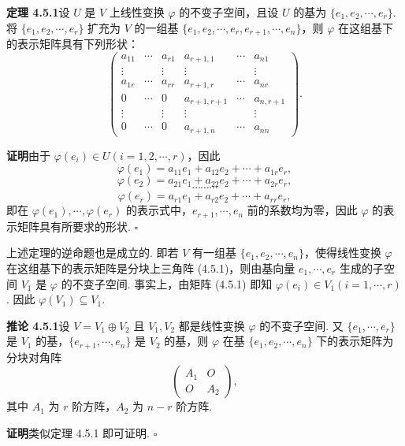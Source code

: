 \documentclass[UTF8,12pt,a4paper,fontset=fandol]{ctexart}
\begin{document}
\noindent\textbf{定理 4.5.1}\quad 设 $U$ 是 $V$ 上线性变换 $\varphi$ 的不变子空间，且设 $U$ 的基为 $\{e_1,e_2,\cdots,e_r\}$. 将 $\{e_1,e_2,\cdots,e_r\}$ 扩充为 $V$ 的一组基 $\{e_1,e_2,\cdots,e_r,e_{r+1},\cdots,e_n\}$，则 $\varphi$ 在这组基下的表示矩阵具有下列形状：
\begin{equation}
\left(\begin{array}{cccccc}
a_{11} & \cdots & a_{r1} & a_{r+1,1} & \cdots & a_{n1}\\
\vdots & & \vdots & \vdots & & \vdots\\
a_{1r} & \cdots & a_{rr} & a_{r+1,r} & \cdots & a_{nr}\\
0 & \cdots & 0 & a_{r+1,r+1} & \cdots & a_{n,r+1}\\
\vdots & & \vdots & \vdots & & \vdots\\
0 & \cdots & 0 & a_{r+1,n} & \cdots & a_{nn}
\end{array}\right).
\tag{4.5.1}
\end{equation}

\noindent\textbf{证明}\quad 由于 $\varphi(e_i)\in U(i=1,2,\cdots,r)$，因此
\[
\varphi(e_1)=a_{11}e_1+a_{12}e_2+\cdots+a_{1r}e_r,
\]
\[
\varphi(e_2)=a_{21}e_1+a_{22}e_2+\cdots+a_{2r}e_r,
\]
\[
\cdots\cdots\cdots
\]
\[
\varphi(e_r)=a_{r1}e_1+a_{r2}e_2+\cdots+a_{rr}e_r,
\]
即在 $\varphi(e_1),\cdots,\varphi(e_r)$ 的表示式中，$e_{r+1},\cdots,e_n$ 前的系数均为零，因此 $\varphi$ 的表示矩阵具有所要求的形状. $\square$

上述定理的逆命题也是成立的. 即若 $V$ 有一组基 $\{e_1,e_2,\cdots,e_n\}$，使得线性变换 $\varphi$ 在这组基下的表示矩阵是分块上三角阵 (4.5.1)，则由基向量 $e_1,\cdots,e_r$ 生成的子空间 $V_1$ 是 $\varphi$ 的不变子空间. 事实上，由矩阵 (4.5.1) 即知 $\varphi(e_i)\in V_1(i=1,\cdots,r)$. 因此 $\varphi(V_1)\subseteq V_1$.

\noindent\textbf{推论 4.5.1}\quad 设 $V=V_1\oplus V_2$ 且 $V_1,V_2$ 都是线性变换 $\varphi$ 的不变子空间. 又 $\{e_1,\cdots,e_r\}$ 是 $V_1$ 的基，$\{e_{r+1},\cdots,e_n\}$ 是 $V_2$ 的基，则 $\varphi$ 在基 $\{e_1,e_2,\cdots,e_n\}$ 下的表示矩阵为分块对角阵
\begin{equation}
\left(\begin{array}{cc}
A_1 & O\\
O & A_2
\end{array}\right),
\tag{4.5.2}
\end{equation}
其中 $A_1$ 为 $r$ 阶方阵，$A_2$ 为 $n-r$ 阶方阵.

\noindent\textbf{证明}\quad 类似定理 4.5.1 即可证明. $\square$
\end{document}
